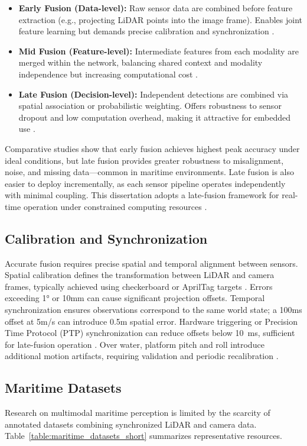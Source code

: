 \begin{itemize}
\item \textbf{Early Fusion (Data-level):} Raw sensor data are combined before feature extraction (e.g., projecting LiDAR points into the image frame). Enables joint feature learning but demands precise calibration and synchronization \cite{vora2020, chen2017}.
\item \textbf{Mid Fusion (Feature-level):} Intermediate features from each modality are merged within the network, balancing shared context and modality independence but increasing computational cost \cite{ku2018, li2022deepfusion, liu2023bevfusion}.
\item \textbf{Late Fusion (Decision-level):} Independent detections are combined via spatial association or probabilistic weighting. Offers robustness to sensor dropout and low computation overhead, making it attractive for embedded use \cite{liang2022, xu2023, qi2021}.
\end{itemize}

Comparative studies show that early fusion achieves highest peak accuracy under ideal conditions, but late fusion provides greater robustness to misalignment, noise, and missing data—common in maritime environments. Late fusion is also easier to deploy incrementally, as each sensor pipeline operates independently with minimal coupling. This dissertation adopts a late-fusion framework for real-time operation under constrained computing resources \cite{bai2022transfusion, li2022deepfusion}.

\subsection{Calibration and Synchronization}
Accurate fusion requires precise spatial and temporal alignment between sensors. Spatial calibration defines the transformation between LiDAR and camera frames, typically achieved using checkerboard or AprilTag targets \cite{iyer2018, yuan2020}. Errors exceeding 1° or 10mm can cause significant projection offsets. Temporal synchronization ensures observations correspond to the same world state; a 100ms offset at 5m/s can introduce 0.5m spatial error. Hardware triggering or Precision Time Protocol (PTP) synchronization can reduce offsets below 10~ms, sufficient for late-fusion operation \cite{bijelic2020}. Over water, platform pitch and roll introduce additional motion artifacts, requiring validation and periodic recalibration \cite{halterman2015}.

\subsection{Maritime Datasets}
Research on multimodal maritime perception is limited by the scarcity of annotated datasets combining synchronized LiDAR and camera data. Table~\ref{table:maritime_datasets_short} summarizes representative resources.

